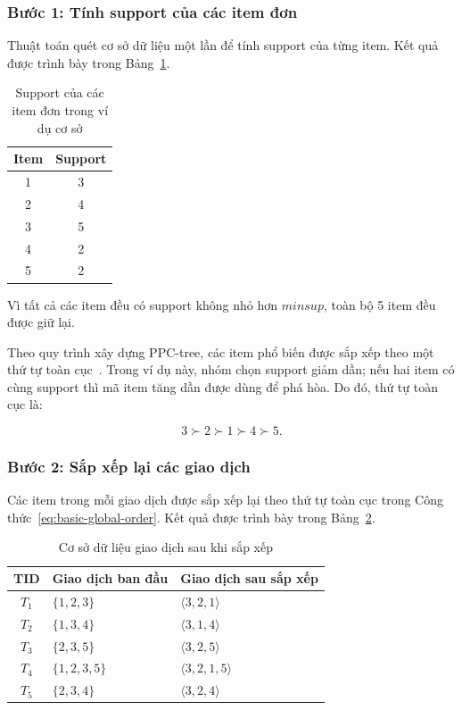\subsubsection{Bước 1: Tính support của các item đơn}

Thuật toán quét cơ sở dữ liệu một lần để tính support của từng item. Kết quả được trình bày trong Bảng~\ref{tab:basic-single-support}.

\begin{table}[H]
\centering
\caption{Support của các item đơn trong ví dụ cơ sở}
\label{tab:basic-single-support}
\begin{tabular}{cc}
\toprule
Item & Support \\
\midrule
1 & 3 \\
2 & 4 \\
3 & 5 \\
4 & 2 \\
5 & 2 \\
\bottomrule
\end{tabular}
\end{table}

Vì tất cả các item đều có support không nhỏ hơn $\mathit{minsup}$, toàn bộ 5 item đều được giữ lại.

Theo quy trình xây dựng PPC-tree, các item phổ biến được sắp xếp theo một
thứ tự toàn cục~\cite{deng2012prepost}. Trong ví dụ này, nhóm chọn support giảm
dần; nếu hai item có cùng support thì mã item tăng dần được dùng để phá hòa.
Do đó, thứ tự toàn cục là:

\begin{equation}
    3 \succ 2 \succ 1 \succ 4 \succ 5.
    \label{eq:basic-global-order}
\end{equation}

\subsubsection{Bước 2: Sắp xếp lại các giao dịch}

Các item trong mỗi giao dịch được sắp xếp lại theo thứ tự toàn cục trong Công thức~\ref{eq:basic-global-order}. Kết quả được trình bày trong Bảng~\ref{tab:basic-sorted-tdb}.

\begin{table}[H]
\centering
\caption{Cơ sở dữ liệu giao dịch sau khi sắp xếp}
\label{tab:basic-sorted-tdb}
\begin{tabular}{cll}
\toprule
TID & Giao dịch ban đầu & Giao dịch sau sắp xếp \\
\midrule
$T_1$ & $\{1,2,3\}$ & $\langle 3,2,1\rangle$ \\
$T_2$ & $\{1,3,4\}$ & $\langle 3,1,4\rangle$ \\
$T_3$ & $\{2,3,5\}$ & $\langle 3,2,5\rangle$ \\
$T_4$ & $\{1,2,3,5\}$ & $\langle 3,2,1,5\rangle$ \\
$T_5$ & $\{2,3,4\}$ & $\langle 3,2,4\rangle$ \\
\bottomrule
\end{tabular}
\end{table}

